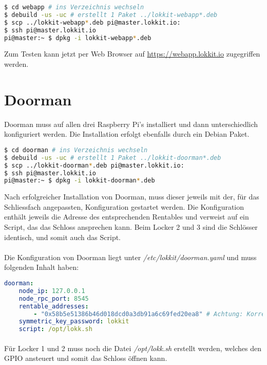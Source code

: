 \begin{lstlisting}[language=bash]
$ cd webapp # ins Verzeichnis wechseln
$ debuild -us -uc # erstellt 1 Paket ../lokkit-webapp*.deb
$ scp ../lokkit-webapp*.deb pi@master.lokkit.io:
$ ssh pi@master.lokkit.io
pi@master:~ $ dpkg -i lokkit-webapp*.deb
\end{lstlisting}

Zum Testen kann jetzt per Web Browser auf \url{https://webapp.lokkit.io} zugegriffen werden.

\section{Doorman}
Doorman muss auf allen drei Raspberry Pi's installiert und dann unterschiedlich konfiguriert werden. Die Installation erfolgt ebenfalls durch ein Debian Paket.

\begin{lstlisting}[language=bash]
$ cd doorman # ins Verzeichnis wechseln
$ debuild -us -uc # erstellt 1 Paket ../lokkit-doorman*.deb
$ scp ../lokkit-doorman*.deb pi@master.lokkit.io:
$ ssh pi@master.lokkit.io
pi@master:~ $ dpkg -i lokkit-doorman*.deb
\end{lstlisting}

Nach erfolgreicher Installation von Doorman, muss dieser jeweils mit der, für das Schliessfach angepassten, Konfiguration gestartet werden. Die Konfiguration enthält jeweils die Adresse des entsprechenden Rentables und verweist auf ein Script, das das Schloss ansprechen kann. Beim Locker 2 und 3 sind die Schlösser identisch, und somit auch das Script. 

\paragraph{}
Die Konfiguration von Doorman liegt unter \emph{/etc/lokkit/doorman.yaml} und muss folgenden Inhalt haben:

\begin{lstlisting}[language=yaml,caption={Doorman-Konfiguration für Locker 2 und 3}]
doorman:
    node_ip: 127.0.0.1
    node_rpc_port: 8545
    rentable_addresses:
        - "0x58b5e51386b46d018dcd0a3db91a6c69fed20ea8" # Achtung: Korrekte Adresse eintragen
    symmetric_key_password: lokkit
    script: /opt/lokk.sh
\end{lstlisting} 

\paragraph{} 
Für Locker 1 und 2 muss noch die Datei \emph{/opt/lokk.sh} erstellt werden, welches den GPIO ansteuert und somit das Schloss öffnen kann.

